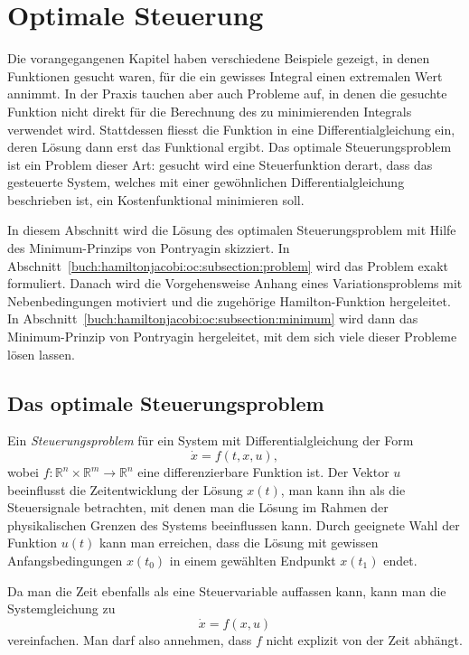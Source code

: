 %
%
%
\section{Optimale Steuerung
\label{buch:hamiltonjacobi:section:oc}}
Die vorangegangenen Kapitel haben verschiedene Beispiele gezeigt,
in denen Funktionen gesucht waren, für die ein gewisses Integral
einen extremalen Wert annimmt.
In der Praxis tauchen aber auch Probleme auf, in denen die
gesuchte Funktion nicht direkt für die Berechnung des zu minimierenden
Integrals verwendet wird.
Stattdessen fliesst die Funktion in eine Differentialgleichung
ein, deren Lösung dann erst das Funktional ergibt.
Das optimale Steuerungsproblem ist ein Problem dieser Art: gesucht
wird eine Steuerfunktion derart, dass das gesteuerte System, welches
mit einer gewöhnlichen Differentialgleichung beschrieben ist, ein
Kostenfunktional minimieren soll.

In diesem Abschnitt wird die Lösung des optimalen Steuerungsproblem
mit Hilfe des Minimum-Prinzips von Pontryagin skizziert.
In Abschnitt~\ref{buch:hamiltonjacobi:oc:subsection:problem}
wird das Problem exakt formuliert.
Danach wird die Vorgehensweise Anhang eines Variationsproblems
mit Nebenbedingungen motiviert und die zugehörige Hamilton-Funktion
hergeleitet.
In Abschnitt~\ref{buch:hamiltonjacobi:oc:subsection:minimum}
wird dann das Minimum-Prinzip von Pontryagin hergeleitet, mit dem
sich viele dieser Probleme lösen lassen.

%
%
\subsection{Das optimale Steuerungsproblem
\label{buch:hamiltonjacobi:oc:subsection:problem}}
Ein {\em Steuerungsproblem} für ein System mit Differentialgleichung
der Form
\[
\dot{x}
=
f(t, x, u),
\]
wobei $f\colon\mathbb{R}^n\times\mathbb{R}^m\to\mathbb{R}^n$
eine differenzierbare Funktion ist.
Der Vektor $u$ beeinflusst die Zeitentwicklung der Lösung $x(t)$, man
kann ihn als die Steuersignale betrachten, mit denen man die Lösung
im Rahmen der physikalischen Grenzen des Systems beeinflussen kann.
Durch geeignete Wahl der Funktion $u(t)$ kann man erreichen, dass 
die Lösung mit gewissen Anfangsbedingungen $x(t_0)$ in einem
gewählten Endpunkt $x(t_1)$ endet.

Da man die Zeit ebenfalls als eine Steuervariable auffassen kann, 
kann man die Systemgleichung zu
\begin{equation*}
\dot{x}
=
f(x,u)
\end{equation*}
vereinfachen.
Man darf also annehmen, dass $f$ nicht explizit von der Zeit
abhängt.

